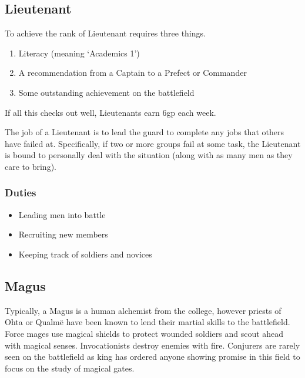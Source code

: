 \begin{multicols}{2}
\subsection{Lieutenant}

To achieve the rank of Lieutenant requires three things.

\begin{enumerate}

  \item{Literacy (meaning `Academics 1')}
  \item{A recommendation from a Captain to a Prefect or Commander}
  \item{Some outstanding achievement on the battlefield}

\end{enumerate}

\noindent
If all this checks out well, Lieutenants earn 6gp each week.

The job of a Lieutenant is to lead the \gls{guard} to complete any jobs that others have failed at.
Specifically, if two or more groups fail at some task, the Lieutenant is bound to personally deal with the situation (along with as many men as they care to bring).

\subsubsection{Duties}

\begin{itemize}

  \item{Leading men into battle}
  \item{Recruiting new members}
  \item{Keeping track of soldiers and novices}

\end{itemize}

\subsection{Magus}

Typically, a Magus is a human alchemist from the \gls{college}, however priests of Ohta or Qualm\"e have been known to lend their martial skills to the battlefield.
Force mages use magical shields to protect wounded soldiers and scout ahead with magical senses.
Invocationists destroy enemies with fire.
Conjurers are rarely seen on the battlefield as \gls{king} has ordered anyone showing promise in this field to focus on the study of magical gates.


\end{multicols}
